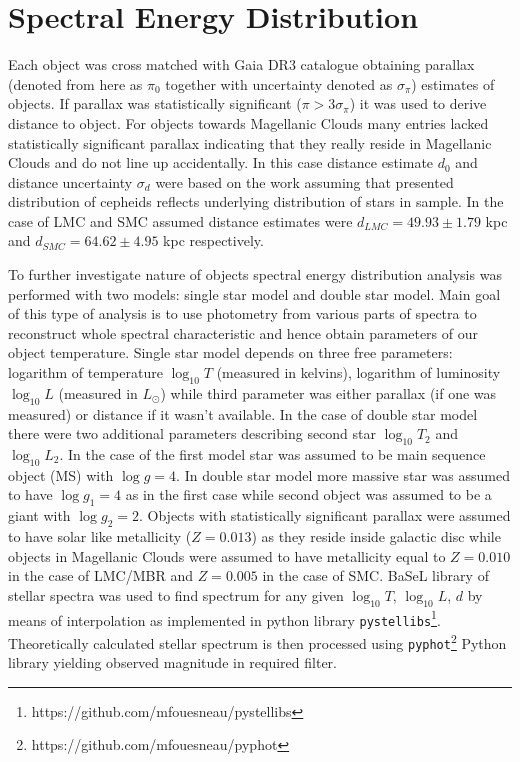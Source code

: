 \documentclass{pracalicmgr}
\begin{document}
\section{Spectral Energy Distribution}
Each object was cross matched  with Gaia DR3 catalogue obtaining parallax (denoted from here as $\pi_0$ together with uncertainty denoted as $\sigma_{\pi}$) estimates of objects. If parallax was statistically significant ($\pi>3\sigma_{\pi}$)
it was used to derive distance to object. For objects towards Magellanic Clouds many entries lacked statistically significant parallax indicating that they really reside in Magellanic Clouds
and do not line up accidentally.
In this case distance estimate $d_0$ and distance uncertainty $\sigma_d$ were based on the work \citep{jacyszyn-dobrzeniecka_ogle-ing_2016} assuming that presented distribution 
of cepheids reflects underlying distribution of stars in sample.
In the case of LMC and SMC assumed distance estimates were  $d_{LMC}=49.93\pm1.79$ kpc and  $d_{SMC}=64.62\pm4.95$ kpc respectively. 

To further investigate nature of objects spectral energy distribution analysis was 
performed with two models: single star model and double star model. Main goal of this type of analysis is to use photometry from various parts of spectra to
reconstruct whole spectral characteristic and hence obtain parameters of our object temperature.
Single star model depends on three free parameters: logarithm of temperature $\log_{10}T$ (measured in kelvins), logarithm of luminosity $\log_{10} L$ (measured in $L_{\odot}$) while third 
parameter was either parallax (if one was measured) or distance if it wasn't available. In the case of double star model there were two additional parameters describing 
second star $\log_{10} T_2$ and $\log_{10} L_2$. In the case of the first model star was assumed to be main sequence object (MS) with $\log{g}=4$. In double star model more massive star 
was assumed to have $\log{g_1}=4$ as in the first case while second object was assumed to be a giant with $\log{g_2}=2$. Objects with statistically significant parallax were assumed to have 
solar like metallicity ($Z=0.013$) as they reside inside galactic disc while objects in Magellanic Clouds 
were assumed to have metallicity equal to $Z=0.010$ in the case of LMC/MBR and $Z=0.005$ in the case of SMC.
BaSeL library of stellar spectra \citep{lejeune_standard_1998} was used to find spectrum for any given $\log_{10}{T}$, $\log_{10} L$, $d$ 
by means of interpolation as implemented in python library
\texttt{pystellibs}\footnote{https://github.com/mfouesneau/pystellibs}.
Theoretically calculated stellar spectrum is then processed using \texttt{pyphot}\footnote{https://github.com/mfouesneau/pyphot} 
Python library yielding observed magnitude in required filter.
\end{document}
